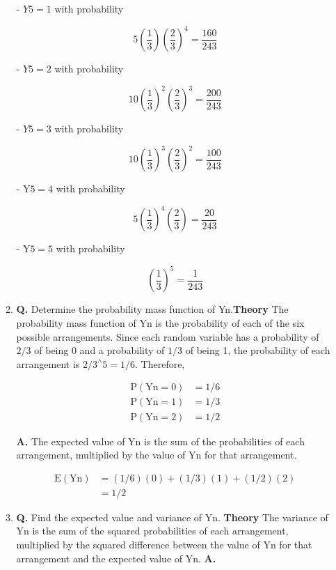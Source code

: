 \documentclass[main.tex]{subfiles}
\begin{document}
\begin{enumerate}
\begin{enumerate}
        - $Y 5=1$ with probability
        
        $$
        5\left(\frac{1}{3}\right)\left(\frac{2}{3}\right)^4=\frac{160}{243}
        $$
        
        - $Y 5=2$ with probability
        
        $$
        10\left(\frac{1}{3}\right)^2\left(\frac{2}{3}\right)^3=\frac{200}{243}
        $$
        
        - $Y 5=3$ with probability
        
        $$
        10\left(\frac{1}{3}\right)^3\left(\frac{2}{3}\right)^2=\frac{100}{243}
        $$
        
        - $\mathrm{Y} 5=4$ with probability
        
        $$
        5\left(\frac{1}{3}\right)^4\left(\frac{2}{3}\right)=\frac{20}{243}
        $$
        
        - $\mathrm{Y} 5=5$ with probability
        
        $$
        \left(\frac{1}{3}\right)^5=\frac{1}{243}
        $$
        
        \item \textbf{Q.} Determine the probability mass function of Yn.\textbf{Theory} The probability mass function of $\mathrm{Yn}$ is the probability of each of the six possible arrangements. Since each random variable has a probability of $2/3$ of being 0 and a probability of $1/3$ of being 1, the probability of each arrangement is $2/3^{\wedge} 5 = 1/6$. Therefore,
        
        $$
        \begin{aligned}
        \mathrm{P}(\mathrm{Yn}=0) & = 1/6 \\
        \mathrm{P}(\mathrm{Yn}=1) & = 1/3 \\
        \mathrm{P}(\mathrm{Yn}=2) & = 1/2
        \end{aligned}
        $$
        
        \textbf {A.} The expected value of $\mathrm{Yn}$ is the sum of the probabilities of each arrangement, multiplied by the value of $\mathrm{Yn}$ for that arrangement.
        
        $$
        \begin{aligned}
        \mathrm{E}(\mathrm{Yn}) & = (1/6)(0) + (1/3)(1) + (1/2)(2) \\
        & = 1/2
        \end{aligned}
        $$  
        
        \item \textbf{Q.} Find the expected value and variance of $\mathrm{Yn}$. \textbf{Theory} The variance of $\mathrm{Yn}$ is the sum of the squared probabilities of each arrangement, multiplied by the squared difference between the value of $\mathrm{Yn}$ for that arrangement and the expected value of $\mathrm{Yn}$. \textbf{A.}
         

\end{enumerate}
\end{enumerate}
\end{document}

